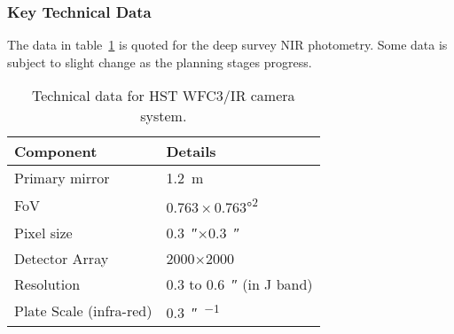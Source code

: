 	\subsubsection{Key Technical Data} %
	\label{ssub:key_technical_data}
		The data in table~\ref{tab:Euclid_technical} is quoted for the deep survey NIR photometry. Some data is subject to slight change as the planning stages progress.
		\begin{table}[ht]
			\begin{center}
				\begin{tabular}{l|l}
					Component & Details \\
					\hline\hline
					Primary mirror		& \SI{1.2}{\metre} \\ \hline
					FoV 				& $0.763\times0.763$\si{\degree\squared} \\ \hline
					Pixel size			& \SI{0.3}{\arcsecond}$\times$\SI{0.3}{\arcsecond} \\ \hline
					Detector Array		& \num{2000}$\times$\num{2000}\,\si{\pixel} \\ \hline
					Resolution 			& 0.3 to \SI{0.6}{\arcsecond} (in J band) \\ \hline
					Plate Scale (infra-red)	& \SI{0.3}{\arcsecond\per\pixel}
				\end{tabular}
			\end{center}
			\caption{Technical data for HST WFC3/IR camera system\cite{WFC3_IHB}.\label{tab:Euclid_technical}}
		\end{table}
